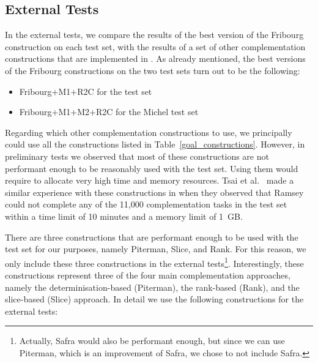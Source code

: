 \subsection{External Tests}
\label{4_external}
In the external tests, we compare the results of the best version of the Fribourg construction on each test set, with the results of a set of other complementation constructions that are implemented in \goal. As already mentioned, the best versions of the Fribourg constructions on the two test sets turn out to be the following:

\begin{itemize}
\item Fribourg+M1+R2C \tabto{4.2cm} for the \goal{} test set
\item Fribourg+M1+M2+R2C \tabto{4.2cm} for the Michel test set
\end{itemize}

Regarding which other complementation constructions to use, we principally could use all the constructions listed in Table~\ref{goal_constructions}. However, in preliminary tests we observed that most of these constructions are not performant enough to be reasonably used with the \goal{} test set. Using them would require to allocate very high time and memory resources. Tsai et al.~\cite{2011_tsai} made a similar experience with these constructions in \goal{} when they observed that Ramsey could not complete any of the 11,000 complementation tasks in the \goal{} test set within a time limit of 10 minutes and a memory limit of 1~GB. 


There are three constructions that are performant enough to be used with the \goal{} test set for our purposes, namely Piterman, Slice, and Rank. For this reason, we only include these three constructions in the external tests\footnote{Actually, Safra would also be performant enough, but since we can use Piterman, which is an improvement of Safra, we chose to not include Safra.}. Interestingly, these constructions represent three of the four main complementation approaches, namely the determinisation-based (Piterman), the rank-based (Rank), and the slice-based (Slice) approach. In detail we use the following constructions for the external tests:

